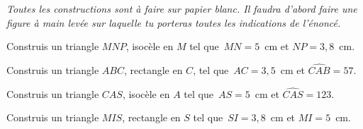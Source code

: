 {\em Toutes les constructions sont à faire sur papier blanc. Il faudra d'abord faire une figure à main levée sur laquelle tu porteras toutes les indications de l'énoncé.}
\begin{myenumerate}
  \item Construis un triangle $MNP$, isocèle en $M$ tel que $MN=5$~cm et $NP=3,8$~cm.
  \item Construis un triangle $ABC$, rectangle en $C$, tel que $AC=3,5$~cm et $\widehat{CAB}=57$\degres.
  \item Construis un triangle $CAS$, isocèle en $A$ tel que $AS=5$~cm et $\widehat{CAS}=123$\degres.
  \item Construis un triangle $MIS$, rectangle en $S$ tel que $SI=3,8$~cm et $MI=5$~cm.
\end{myenumerate}